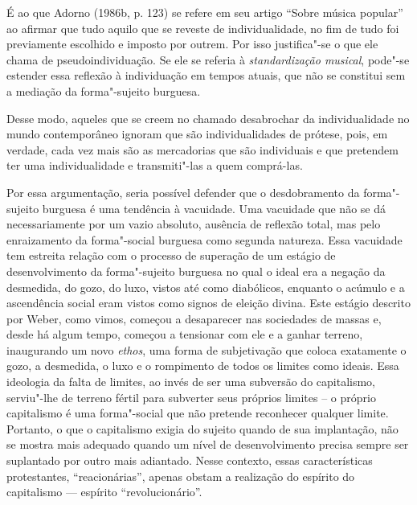 É ao que Adorno (1986b, p. 123) se refere em seu artigo ``Sobre música
popular'' ao afirmar que tudo aquilo que se reveste de individualidade,
no fim de tudo foi previamente escolhido e imposto por outrem. Por isso
justifica"-se o que ele chama de pseudoindividuação. Se ele se referia à
\emph{standardização musical}, pode"-se estender essa reflexão à
individuação em tempos atuais, que não se constitui sem a mediação da
forma"-sujeito burguesa.

Desse modo, aqueles que se creem no chamado desabrochar da
individualidade no mundo contemporâneo ignoram que são individualidades
de prótese, pois, em verdade, cada vez mais são as mercadorias que são
individuais e que pretendem ter uma individualidade e transmiti"-las a
quem comprá-las.

Por essa argumentação, seria possível defender que o desdobramento da
forma"-sujeito burguesa é uma tendência à vacuidade. Uma vacuidade que
não se dá necessariamente por um vazio absoluto, ausência de reflexão
total, mas pelo enraizamento da forma"-social burguesa como segunda
natureza. Essa vacuidade tem estreita relação com o processo de
superação de um estágio de desenvolvimento da forma"-sujeito burguesa no
qual o ideal era a negação da desmedida, do gozo, do luxo, vistos até
como diabólicos, enquanto o acúmulo e a ascendência social eram vistos
como signos de eleição divina. Este estágio descrito por Weber,
como vimos, começou a desaparecer nas sociedades de
massas e, desde há algum tempo, começou a tensionar com ele e a ganhar
terreno, inaugurando um novo \emph{ethos}, uma forma de subjetivação que
coloca exatamente o gozo, a desmedida, o luxo e o rompimento de todos os
limites como ideais. Essa ideologia da falta de limites, ao invés de ser
uma subversão do capitalismo, serviu"-lhe de terreno fértil para
subverter seus próprios limites -- o próprio capitalismo é uma
forma"-social que não pretende reconhecer qualquer limite.
Portanto, o que o capitalismo exigia do sujeito quando de sua
implantação, não se mostra mais adequado quando um nível de
desenvolvimento precisa sempre ser suplantado por outro mais adiantado.
Nesse contexto, essas características protestantes, ``reacionárias'',
apenas obstam a realização do espírito do capitalismo --- espírito
``revolucionário''.

